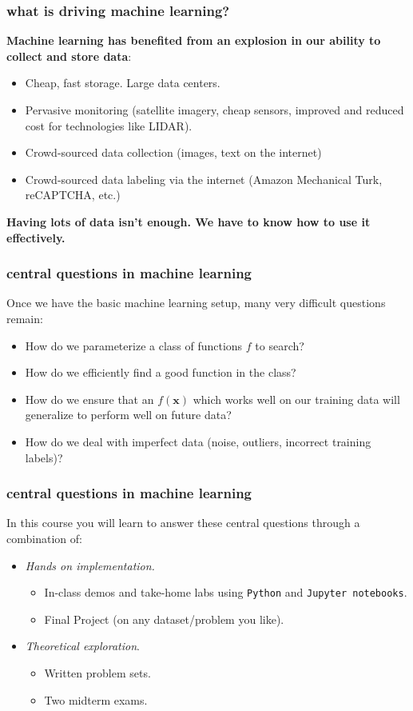 \documentclass[handout,compress]{beamer}
\newcommand{\bv}[1]{\mathbf{#1}}
\begin{document}
\begin{frame}
	\frametitle{what is driving machine learning?}
	\textbf{Machine learning has benefited from an explosion in our ability to collect and store data}:
	\begin{itemize}
		\item Cheap, fast storage. Large data centers. 
		\item Pervasive monitoring (satellite imagery, cheap sensors, improved and reduced cost for technologies like LIDAR).
		\item Crowd-sourced data collection (images, text on the internet)
		\item Crowd-sourced data labeling via the internet (Amazon Mechanical Turk, reCAPTCHA, etc.)
	\end{itemize}
	\begin{center}
		\textbf{\alert{Having lots of data isn't enough. We have to know how to use it effectively.}}
	\end{center}
\end{frame}

\begin{frame}
	\frametitle{central questions in machine learning}
	Once we have the basic machine learning setup, many very difficult questions remain:
	\begin{itemize}
		\item How do we \alert{parameterize} a class of functions $f$ to search?
		\item How do we \alert{efficiently find} a good function in the class?
		\item How do we ensure that an $f(\bv{x})$ which works well on our training data will \alert{generalize} to perform well on future data? 
		\item How do we deal with \alert{imperfect data} (noise, outliers, incorrect training labels)?
	\end{itemize}
\end{frame}

\begin{frame}
	\frametitle{central questions in machine learning}
	In this course you will learn to answer these central questions through a combination of:
	\begin{itemize}
		\item \emph{Hands on implementation.}
		\begin{itemize}
			\item In-class demos and take-home labs using \texttt{Python} and \texttt{Jupyter notebooks}.
			\item Final Project (on any dataset/problem you like).
		\end{itemize}
		\item \emph{Theoretical exploration}. 
		\begin{itemize}
			\item Written problem sets.
			\item Two midterm exams.
		\end{itemize}
	\end{itemize}
\end{frame}
\end{document}
